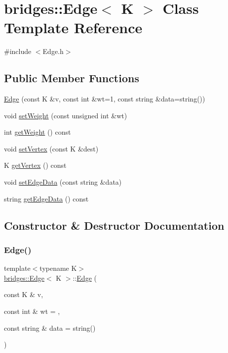 \hypertarget{classbridges_1_1_edge}{}\section{bridges\+:\+:Edge$<$ K $>$ Class Template Reference}
\label{classbridges_1_1_edge}


{\ttfamily \#include $<$Edge.\+h$>$}

\subsection*{Public Member Functions}
\begin{DoxyCompactItemize}
\item 
\hyperlink{classbridges_1_1_edge_a5c574e9dc244ddbf50edbeabc4564061}{Edge} (const K \&v, const int \&wt=1, const string \&data=string())
\item 
void \hyperlink{classbridges_1_1_edge_ad087fc6e5f669102a15147cb6b9c1025}{set\+Weight} (const unsigned int \&wt)
\item 
int \hyperlink{classbridges_1_1_edge_a7bd535b15560a29ffbdc16a2c8a7678d}{get\+Weight} () const
\item 
void \hyperlink{classbridges_1_1_edge_ad34446f673287f3291a0c68efd3613e7}{set\+Vertex} (const K \&dest)
\item 
K \hyperlink{classbridges_1_1_edge_a3cca91d2fdd3824551dbe8b4c0b69b2c}{get\+Vertex} () const
\item 
void \hyperlink{classbridges_1_1_edge_a4521143efeb4621df1ac9017dbc3461d}{set\+Edge\+Data} (const string \&data)
\item 
string \hyperlink{classbridges_1_1_edge_aa2116bb00dafd313b33758716cea853e}{get\+Edge\+Data} () const
\end{DoxyCompactItemize}


\subsection{Constructor \& Destructor Documentation}
\hypertarget{classbridges_1_1_edge_a5c574e9dc244ddbf50edbeabc4564061}{}\label{classbridges_1_1_edge_a5c574e9dc244ddbf50edbeabc4564061} 
\subsubsection{\texorpdfstring{Edge()}{Edge()}}
{\footnotesize\ttfamily template$<$typename K$>$ \\
\hyperlink{classbridges_1_1_edge}{bridges\+::\+Edge}$<$ K $>$\+::\hyperlink{classbridges_1_1_edge}{Edge} (\begin{DoxyParamCaption}\item[{const K \&}]{v,  }\item[{const int \&}]{wt = {},  }\item[{const string \&}]{data = {\ttfamily string()} }\end{DoxyParamCaption})\hspace{0.3cm}{\ttfamily [inline]}}

